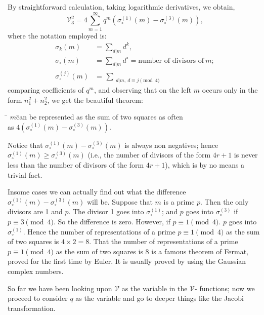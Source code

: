 By straightforward calculation, taking logarithmic derivatives, we
obtain, 
$$
\mathscr{V}_3^2 = 4 \sum^\infty_{m=1} q^m (\sigma_\circ^{(1)} (m) -
\sigma_\circ^{(3)} (m)),
$$
where the notation employed is:
\begin{align*}
  \sigma_k(m) & = \sum_{d|m} d^k,\\
  \sigma_\circ (m) & = \sum_{d|m} d^\circ = \text{number of divisors
    of}~m;\\
  \sigma_\circ^{(j)} (m) & = \mathop{\sum ~d^\circ}_{d|m, ~d\equiv j \pmod{4}}
\end{align*}
comparing coefficients of $q^m$, and observing that on the left $m$
occurs only in the form $n_1^2 + n^2_2$, we get the beautiful theorem:
\begin{tabbing}
  \qquad \= $m$\quad  \= can be represented as the sum of two squares as
  often\\
  \> as \> $4(\sigma_\circ^{(1)} (m) - \sigma_\circ^{(3)} (m))$.
\end{tabbing}

Notice that $\sigma_\circ^{(1)}(m) - \sigma_\circ^{(3)}(m)$ is always
non negatives; hence $\sigma_\circ^{(1)}(m) \geq
\sigma_\circ^{(3)}(m)$ (i.e., the number of divisors of the form
$4r+1$ is never less than the number of divisors of the form
$4r+1$), which is by no means a trivial fact.

In\pageoriginale some cases we can actually find out what the
difference $\sigma_\circ^{(1)}(m)- \sigma_\circ^{(3)} (m)$ will
be. Suppose that $m$ is a prime $p$. Then the only divisors are 1 and
$p$. The divisor 1 goes into $\sigma_\circ^{(1)}$; and $p$ goes into
$\sigma_\circ^{(3)}$ if $p \equiv 3 \pmod{4}$. So the difference is
zero. However, if $p \equiv 1 \pmod{4}$. $p$ goes into
$\sigma_\circ^{(1)}$. Hence the number of representations of a prime $p
\equiv 1 \pmod{4}$ as the sum of two squares is $4 \times 2 =8$. That
the number of representations of a prime $p \equiv 1 \pmod{4}$ as the
sum of two squares is 8 is a famous theorem of Fermat, proved for the
first time by Euler. It is usually proved by using the Gaussian
complex numbers. 

So far we have been looking upon $\mathscr{V}$ as the variable in the
$\mathscr{V}$- functions; now we proceed to consider $q$ as the
variable and go to deeper things like the Jacobi transformation.

